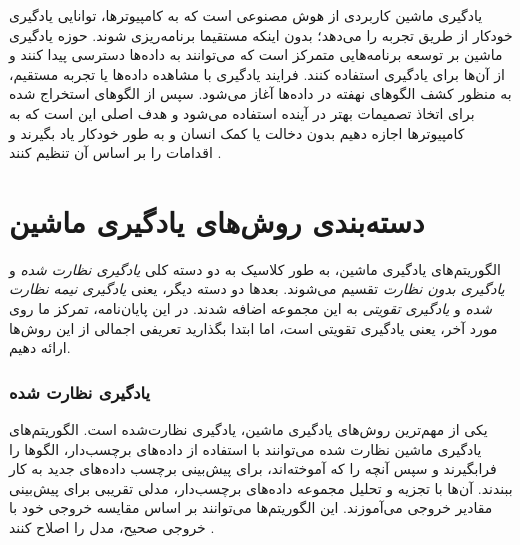 
یادگیری ماشین کاربردی از هوش مصنوعی 
است که به کامپیوترها، توانایی یادگیری خودکار از طریق تجربه  را می‌دهد؛ بدون اینکه مستقیما برنامه‌ریزی شوند. حوزه یادگیری ماشین بر توسعه برنامه‌هایی متمرکز است که می‌توانند به داده‌ها دسترسی پیدا کنند و از آن‌ها برای یادگیری استفاده کنند. فرایند یادگیری با مشاهده داده‌ها یا تجربه مستقیم،  به منظور کشف الگوهای نهفته در داده‌ها آغاز می‌شود.  سپس از الگوهای  استخراج شده برای اتخاذ تصمیمات بهتر در آینده استفاده می‌شود و هدف اصلی این است که به کامپیوترها اجازه دهیم بدون دخالت یا کمک انسان و به طور خودکار یاد بگیرند و اقدامات را بر اساس آن تنظیم کنند
\cite{mldef}.

\section{دسته‌بندی روش‌های یادگیری ماشین}
الگوریتم‌های یادگیری ماشین، به طور کلاسیک به دو دسته کلی 
\textit{یادگیری نظارت شده}
و 
\textit{یادگیری بدون نظارت}
تقسیم می‌شوند. بعدها دو دسته دیگر، یعنی 
\textit{یادگیری نیمه نظارت شده}
و
\textit{یادگیری تقویتی}
  به این مجموعه اضافه شدند. در این پایان‌نامه، تمرکز ما روی مورد آخر، یعنی یادگیری تقویتی است، اما ابتدا بگذارید تعریفی اجمالی از این روش‌ها ارائه دهیم.
\subsubsection{یادگیری نظارت شده}

یکی از مهم‌ترین روش‌های یادگیری ماشین، یادگیری نظارت‌شده است. الگوریتم‌های یادگیری ماشین نظارت ‌شده می‌توانند  با استفاده از داده‌های برچسب‌دار، الگوها را فرابگیرند و سپس آنچه را که آموخته‌اند، برای پیش‌بینی برچسب داده‌های جدید به کار ببندند.
آن‌ها با تجزیه و تحلیل مجموعه داده‌های برچسب‌دار، مدلی تقریبی برای پیش‌بینی مقادیر خروجی می‌‌آموزند. این الگوریتم‌ها می‌توانند بر اساس مقایسه خروجی خود با خروجی صحیح، مدل را اصلاح کنند
\cite{mldef}.

